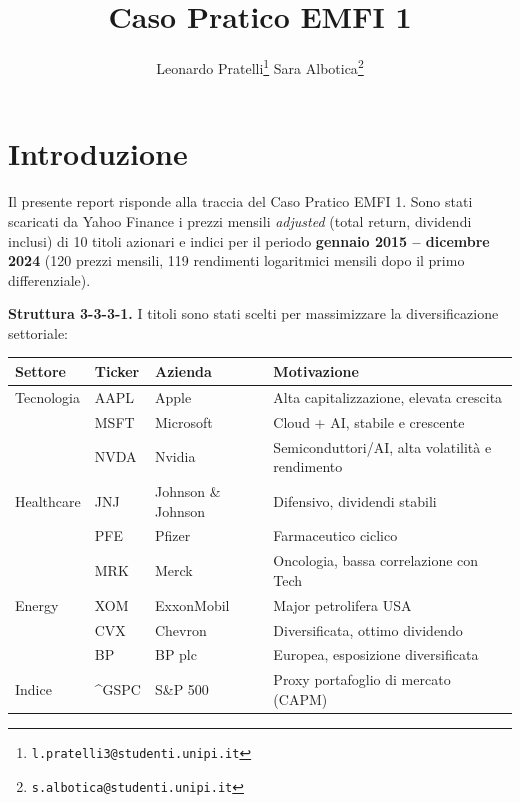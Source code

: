 \documentclass[11pt]{article}
\date{}
\title{Caso Pratico  EMFI 1}
\author{Leonardo Pratelli\thanks{\texttt{l.pratelli3@studenti.unipi.it}}%
        \quad Sara Albotica\thanks{\texttt{s.albotica@studenti.unipi.it}}}
\begin{document}
\maketitle
\tableofcontents
\newpage

\section*{Introduzione}

Il presente report risponde alla traccia del Caso Pratico EMFI 1.
Sono stati scaricati da Yahoo Finance i prezzi mensili \emph{adjusted}
(total return, dividendi inclusi) di 10 titoli azionari e indici per
il periodo \textbf{gennaio 2015 -- dicembre 2024} (120 prezzi mensili,
119 rendimenti logaritmici mensili dopo il primo differenziale).

\textbf{Struttura 3-3-3-1.} I titoli sono stati scelti per massimizzare
la diversificazione settoriale:

\begin{center}
\begin{tabular}{llll}
\toprule
\textbf{Settore} & \textbf{Ticker} & \textbf{Azienda} & \textbf{Motivazione} \\
\midrule
Tecnologia   & AAPL & Apple     & Alta capitalizzazione, elevata crescita \\
             & MSFT & Microsoft & Cloud + AI, stabile e crescente \\
             & NVDA & Nvidia    & Semiconduttori/AI, alta volatilità e rendimento \\
Healthcare   & JNJ  & Johnson \& Johnson & Difensivo, dividendi stabili \\
             & PFE  & Pfizer    & Farmaceutico ciclico \\
             & MRK  & Merck     & Oncologia, bassa correlazione con Tech \\
Energy       & XOM  & ExxonMobil & Major petrolifera USA \\
             & CVX  & Chevron   & Diversificata, ottimo dividendo \\
             & BP   & BP plc    & Europea, esposizione diversificata \\
Indice       & \^{}GSPC & S\&P 500 & Proxy portafoglio di mercato (CAPM) \\
\bottomrule
\end{tabular}
\end{center}
\end{document}
